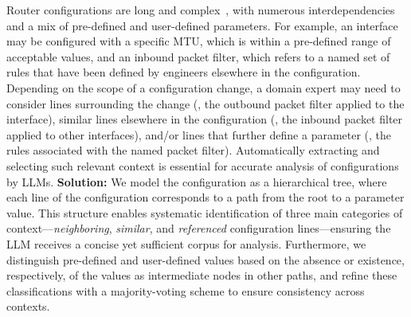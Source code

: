 Router configurations are long and complex~\cite{benson2009complexitymetrics}, with numerous interdependencies and a mix of pre-defined and user-defined parameters. For example, an interface may be configured with a specific MTU, which is within a pre-defined range of acceptable values, and an inbound packet filter, which refers to a named set of rules that have been defined by engineers elsewhere in the configuration. Depending on the scope of a configuration change, a domain expert may need to consider lines surrounding the change (\eg, the outbound packet filter applied to the interface), similar lines elsewhere in the configuration (\eg, the inbound packet filter applied to other interfaces), and/or lines that further define a parameter (\eg, the rules associated with the named packet filter). Automatically extracting and selecting such relevant context is essential for accurate analysis of configurations by LLMs. 
\textbf{Solution:} We model the configuration as a hierarchical tree, where each  line of the configuration corresponds to a path from the root to a parameter value.  This structure enables systematic identification of three main categories of context---\emph{neighboring}, \emph{similar}, and \emph{referenced} configuration lines—ensuring the LLM receives a concise yet sufficient corpus for analysis. Furthermore, we distinguish pre-defined and user-defined values based on the absence or existence, respectively, of the values as intermediate nodes in other paths, and refine these classifications with a majority-voting scheme to ensure consistency across contexts.



